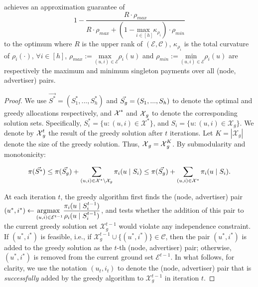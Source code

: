 \begin{theorem}\label{theo:cs-earm1}
\CSRM achieves an approximation guarantee of
$$1 - \dfrac{R \cdot \rho_{max} }{R \cdot \rho_{max} + (1 - \underset{i \in [h]} {\text{max }} {\kappa_{\rho_{i}}}) \cdot \rho_{min}} $$
 to the optimum where $R$ is the upper rank of $(\mathcal{E}, \mathcal{C})$, $\kappa_{\rho_{i}}$ is the total curvature of $\rho_i(\cdot)$, $\forall i \in [h]$,  $\rho_{max} := \underset{(u,i) \in \mathcal{E}} {\text{max }} \rho_{i}(u) $ and $\rho_{min} := \underset{(u,i) \in \mathcal{E}} {\text{min }} \rho_{i}(u) $ are respectively the maximum and minimum singleton payments over all (node, advertiser) pairs.
\end{theorem}
\begin{proof}
We use $\vec{S^*} = (S_1^*, ..., S_h^*)$ and $\vec{S_g} = (S_1, ..., S_h)$ to denote the optimal and greedy allocations respectively, and $\mbox{$\mathcal{X}$}^*$ and $\mbox{$\mathcal{X}$}_g$ to denote the corresponding solution sets. Specifically, $S_i^* = \{u : (u,i) \in \mathcal{X}^*\}$, and $S_i = \{u : (u,i) \in \mathcal{X}_g \}$. We denote by $\mbox{$\mathcal{X}$}_g^t$ the result of the greedy solution after $t$ iterations. Let $K = |\mathcal{X}_g|$ denote the size of the greedy solution. Thus, $\mbox{$\mathcal{X}$}_g = \mbox{$\mathcal{X}$}_g^K$. By submodularity and monotonicity:
\begin{small}
$$\pi(\vec{S^*}) \le \pi(\vec{S_g})  + \sum_{(u,i) \in \mathcal{X}^* \setminus \mathcal{X}_g} \pi_i(u \mid S_i) \le \pi(\vec{S_g})  + \sum_{(u,i) \in \mathcal{X}^*} \pi_i(u \mid S_i).$$
\end{small}
At each iteration $t$, the greedy algorithm first finds the (node, advertiser) pair $(u^*,i^*) \leftarrow \underset{(u,i) \in \mathcal{E}^{t-1}} {\operatorname*{\arg\!\max~}} \dfrac{\pi_i(u \mid S^{t-1}_i)}{\rho_i(u \mid S^{t-1}_i)}$, and tests whether the addition of this pair to the current greedy solution set $\mathcal{X}_g^{t-1}$ would violate any independence constraint. If $(u^*,i^*)$ is feasible, i.e., if $\mathcal{X}_g^{t-1} \cup \{(u^*,i^*)\} \in \mathcal{C}$, then the pair $(u^*,i^*)$ is added to the greedy solution as the $t$-th (node, advertiser) pair; otherwise, $(u^*,i^*)$ is removed from the current ground set $\mathcal{E}^{t-1}$. In what follows, for clarity, we use the notation $(u_t, i_t)$ to denote the (node, advertiser) pair that is \emph{successfully} added by the greedy algorithm to $\mathcal{X}_g^{t-1}$ in iteration $t$.


\end{proof}
